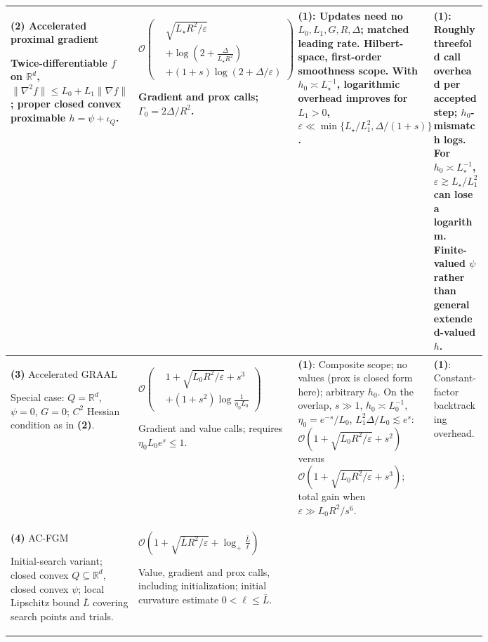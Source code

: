 \begin{table}[tp]
\begin{threeparttable}
\begin{tabularx}{\linewidth}{@{}>{\raggedright\arraybackslash}p{0.18\linewidth}>{\raggedright\arraybackslash}p{0.37\linewidth}>{\raggedright\arraybackslash}p{0.24\linewidth}>{\raggedright\arraybackslash}X@{}}
\textbf{(2)} Accelerated proximal gradient \citep[Thm.~B.1]{LiLaiAnHuWen2026v3Composite}\par Twice-differentiable $f$ on $\mathbb R^d$, $\|\nabla^2f\|\le L_0+L_1\|\nabla f\|$; proper closed convex proximable $h=\psi+\iota_Q$.
& $\displaystyle\mathcal{O}\!\left(\begin{aligned}
&\sqrt{L_\star R^2/\varepsilon}\\
&+\log\!\left(2+\frac{\Delta}{L_\star R^2}\right)\\
&+(1+s)\log(2+\Delta/\varepsilon)
\end{aligned}\right)$\par Gradient and prox calls; $\Gamma_0=2\Delta/R^2$.
& \textbf{(1)}: Updates need no $L_0,L_1,G,R,\Delta$; matched leading rate. Hilbert-space, first-order smoothness scope. With $h_0\asymp L_\star^{-1}$, logarithmic overhead improves for $L_1>0$, $\varepsilon\ll\min\{L_\star/L_1^2,\Delta/(1+s)\}$.
& \textbf{(1)}: Roughly threefold call overhead per accepted step; $h_0$-mismatch logs. For $h_0\asymp L_\star^{-1}$, $\varepsilon\gtrsim L_\star/L_1^2$ can lose a logarithm. Finite-valued $\psi$ rather than general extended-valued $h$. \\
\midrule
\textbf{(3)} Accelerated GRAAL \citep[Cor.~3]{BorodichKovalev2025v2Composite}\par Special case: $Q=\mathbb R^d$, $\psi=0$, $G=0$; $C^2$ Hessian condition as in \textbf{(2)}.
& $\displaystyle\mathcal{O}\!\left(\begin{aligned}
&1+\sqrt{L_0R^2/\varepsilon}+s^3\\
&+(1+s^2)\log\!\frac{1}{\eta_0L_0}
\end{aligned}\right)$\par Gradient and value calls; requires $\eta_0L_0e^s\le1$.
& \textbf{(1)}: Composite scope; no values (prox is closed form here); arbitrary $h_0$. On the overlap, $s\gg1$, $h_0\asymp L_0^{-1}$, $\eta_0=e^{-s}/L_0$, $L_1^2\Delta/L_0\lesssim e^s$: $\mathcal{O}(1+\sqrt{L_0R^2/\varepsilon}+s^2)$ versus $\mathcal{O}(1+\sqrt{L_0R^2/\varepsilon}+s^3)$; total gain when $\varepsilon\gg L_0R^2/s^6$.
& \textbf{(1)}: Constant-factor backtracking overhead. \\
\midrule
\textbf{(4)} AC-FGM \citep[Cor.~1 and subsequent remark]{LiLan2024v3Composite}\par Initial-search variant; closed convex $Q\subseteq\mathbb R^d$, closed convex $\psi$; local Lipschitz bound $\bar L$ covering search points and trials.
& $\displaystyle\mathcal{O}\!\left(1+\sqrt{\bar L R^2/\varepsilon}+\log_+\!\frac{\bar L}{\ell}\right)$\par Value, gradient and prox calls, including initialization; initial curvature estimate $0<\ell\le\bar L$.

\end{tabularx}
\end{threeparttable}
\end{table}
